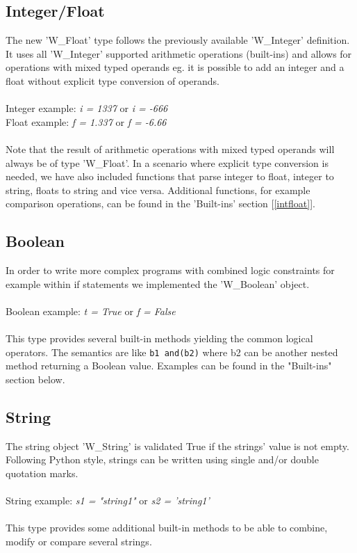 \documentclass{article}
\begin{document}
\subsection{Integer/Float}
The new 'W\_Float' type follows the previously available 'W\_Integer' definition. It uses all 'W\_Integer' supported arithmetic operations (built-ins) and allows for operations with mixed typed operands eg. it is possible to add an integer and a float without explicit type conversion of operands. \\
\\ Integer example: \textit{i = 1337} or \textit{i = -666} 
\\ Float example: \textit{f = 1.337} or \textit{f = -6.66} \\\\
Note that the result of arithmetic operations with mixed typed operands will always be of type 'W\_Float'. In a scenario where explicit type conversion is needed, we have also included functions that parse integer to float, integer to string, floats to string and vice versa. Additional functions, for example comparison operations, can be found in the 'Built-ins' section [\ref{intfloat}].

\subsection{Boolean}
In order to write more complex programs with combined logic constraints for example within if statements we implemented the 'W\_Boolean' object.\\
\\ Boolean example: \textit{t = True} or \textit{f = False} \\\\
This type provides several built-in methods yielding the common logical operators.
The semantics are like \texttt{b1 and(b2)} where b2 can be another nested method returning a Boolean value. Examples can be found in the "Built-ins" section below.


\subsection{String}
The string object 'W\_String' is validated True if the strings' value is not empty. Following Python style, strings can be written using single and/or double quotation marks.\\
\\ String example: \textit{s1 = "string1"} or \textit{s2 = 'string1'} \\\\
This type provides some additional built-in methods to be able to combine, modify or compare several strings.
\end{document}
